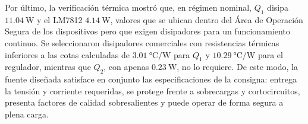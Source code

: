 Por último, la verificación térmica mostró que, en régimen nominal, $Q_1$ disipa $\SI{11.04}{\watt}$ y el LM7812
$\SI{4.14}{\watt}$, valores que se ubican dentro del Área de Operación Segura de los dispositivos pero que exigen
disipadores para un funcionamiento continuo. Se seleccionaron disipadores comerciales con resistencias térmicas
inferiores a las cotas calculadas de $\SI{3.01}{\celsius/\watt}$ para $Q_1$ y $\SI{10.29}{\celsius/\watt}$ para
el regulador, mientras que $Q_2$, con apenas $\SI{0.23}{\watt}$, no lo requiere. De este modo, la fuente diseñada
satisface en conjunto las especificaciones de la consigna: entrega la tensión y corriente requeridas, se protege
frente a sobrecargas y cortocircuitos, presenta factores de calidad sobresalientes y puede operar de forma
segura a plena carga.
